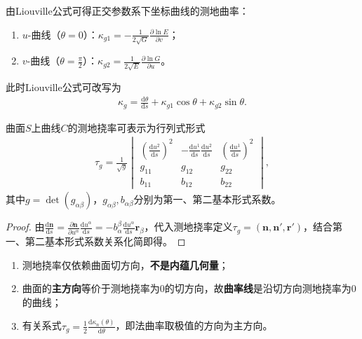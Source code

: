\documentclass[../../main.tex]{subfiles}%
\begin{document}
\begin{remark}
由Liouville公式可得正交参数系下坐标曲线的测地曲率：
\begin{enumerate}[(1)]
\item $u$-曲线（$\theta=0$）：$\displaystyle\kappa_{g1}=-\frac{1}{2\sqrt{G}}\frac{\partial\ln E}{\partial v}$；
\item $v$-曲线（$\theta=\frac{\pi}{2}$）：$\displaystyle\kappa_{g2}=\frac{1}{2\sqrt{E}}\frac{\partial\ln G}{\partial u}$。
\end{enumerate}
此时Liouville公式可改写为
\begin{align*}
\kappa_g=\frac{\mathrm{d}\theta}{\mathrm{d}s}+\kappa_{g1}\cos\theta+\kappa_{g2}\sin\theta.
\end{align*}
\end{remark}

\begin{proposition}
曲面$S$上曲线$C$的测地挠率可表示为行列式形式
\begin{align}
\tau_g=\frac{1}{\sqrt{g}}
\begin{vmatrix}
\left(\frac{\mathrm{d}u^2}{\mathrm{d}s}\right)^2&-\frac{\mathrm{d}u^1}{\mathrm{d}s}\frac{\mathrm{d}u^2}{\mathrm{d}s}&\left(\frac{\mathrm{d}u^1}{\mathrm{d}s}\right)^2\\
g_{11}&g_{12}&g_{22}\\
b_{11}&b_{12}&b_{22}
\end{vmatrix},\label{eq:taugdet}
\end{align}
其中$g=\det(g_{\alpha\beta})$，$g_{\alpha\beta},b_{\alpha\beta}$分别为第一、第二基本形式系数。
\end{proposition}
\begin{proof}
由$\frac{\mathrm{d}\boldsymbol{n}}{\mathrm{d}s}=\frac{\partial\boldsymbol{n}}{\partial u^\alpha}\frac{\mathrm{d}u^\alpha}{\mathrm{d}s}=-b_\alpha^\beta\frac{\mathrm{d}u^\alpha}{\mathrm{d}s}\boldsymbol{r}_\beta$，代入测地挠率定义$\tau_g=(\boldsymbol{n},\boldsymbol{n}',\boldsymbol{r}')$，结合第一、第二基本形式系数关系化简即得。
\end{proof}

\begin{remark}
\begin{enumerate}[(1)]
\item 测地挠率仅依赖曲面切方向，\textbf{不是内蕴几何量}；
\item 曲面的\textbf{主方向}等价于测地挠率为$0$的切方向，故\textbf{曲率线}是沿切方向测地挠率为$0$的曲线；
\item 有关系式$\displaystyle\tau_g=\frac{1}{2}\frac{\mathrm{d}\kappa_n(\theta)}{\mathrm{d}\theta}$，即法曲率取极值的方向为主方向。
\end{enumerate}
\end{remark}
\end{document}
